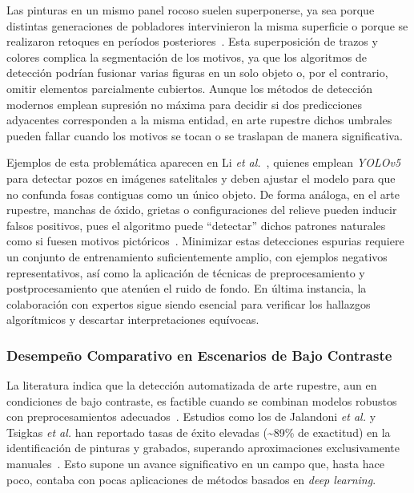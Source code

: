 Las pinturas en un mismo panel rocoso suelen superponerse, ya sea porque distintas generaciones de pobladores intervinieron la misma superficie o porque se realizaron retoques en períodos posteriores~\cite{horn2022}.
Esta superposición de trazos y colores complica la segmentación de los motivos, ya que los algoritmos de detección podrían fusionar varias figuras en un solo objeto o, por el contrario, omitir elementos parcialmente cubiertos.
Aunque los métodos de detección modernos emplean supresión no máxima para decidir si dos predicciones adyacentes corresponden a la misma entidad, en arte rupestre dichos umbrales pueden fallar cuando los motivos se tocan o se traslapan de manera significativa.

Ejemplos de esta problemática aparecen en Li \textit{et al.}~\cite{li2022}, quienes emplean \textit{YOLOv5} para detectar pozos en imágenes satelitales y deben ajustar el modelo para que no confunda fosas contiguas como un único objeto.
De forma análoga, en el arte rupestre, manchas de óxido, grietas o configuraciones del relieve pueden inducir falsos positivos, pues el algoritmo puede “detectar” dichos patrones naturales como si fuesen motivos pictóricos~\cite{horn2022}.
Minimizar estas detecciones espurias requiere un conjunto de entrenamiento suficientemente amplio, con ejemplos negativos representativos, así como la aplicación de técnicas de preprocesamiento y postprocesamiento que atenúen el ruido de fondo.
En última instancia, la colaboración con expertos sigue siendo esencial para verificar los hallazgos algorítmicos y descartar interpretaciones equívocas.

\subsubsection{Desempeño Comparativo en Escenarios de Bajo Contraste}

La literatura indica que la detección automatizada de arte rupestre, aun en condiciones de bajo contraste, es factible cuando se combinan modelos robustos con preprocesamientos adecuados~\cite{fattal2007}.
Estudios como los de Jalandoni \textit{et al.} y Tsigkas \textit{et al.} han reportado tasas de éxito elevadas (\textasciitilde 89\% de exactitud) en la identificación de pinturas y grabados, superando aproximaciones exclusivamente manuales~\cite{jalandoni2022,tsigkas2020}.
Esto supone un avance significativo en un campo que, hasta hace poco, contaba con pocas aplicaciones de métodos basados en \textit{deep learning}.


